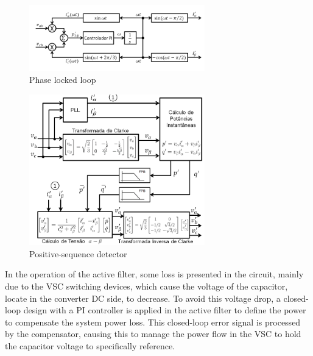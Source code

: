 \begin{figure}[!th]
	\centering
	\includegraphics[width=3in]{Figures/PLL.png}
	\caption{Phase locked loop}
	\label{fig:PLL.png}
\end{figure}

\begin{figure}[!th]
	\centering
	\includegraphics[width=3in]{Figures/detector_seq_positiva.png}
	\caption{Positive-sequence detector}
	\label{fig:detector_seq_positiva.png}
\end{figure}

In the operation of the active filter, some loss is presented in the circuit, mainly due to the VSC switching devices, which cause the voltage of the capacitor, locate in the converter DC side, to decrease. To avoid this voltage drop, a closed-loop design with a PI controller is applied in the active filter to define the power to compensate the system power loss. This closed-loop error signal is processed by the compensator, causing this to manage the power flow in the VSC to hold the capacitor voltage to specifically reference.
